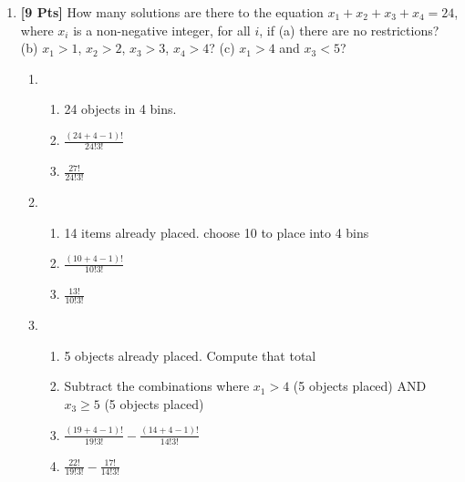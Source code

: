 \documentclass[11pt]{article}
\begin{document}
\begin{enumerate}
        \item {\bf [9 Pts]} How many solutions are there to the equation $x_1 + x_2 + x_3 + x_4 = 24$, where $x_i$ is a non-negative integer, for all $i$, if (a) there are no restrictions? (b) $x_1 > 1$, $x_2 > 2$, $x_3 > 3$, $x_4 > 4$? (c) $x_1 > 4$ and $x_3 < 5$?
        \begin{enumerate}
            \item
            \begin{enumerate}
                \item 24 objects in 4 bins.
                \item $\frac{(24 + 4 - 1)!}{24!3!}$
                \item $\frac{27!}{24!3!}$
            \end{enumerate}
            \item
            \begin{enumerate}
                \item 14 items already placed. choose 10 to place into 4 bins
                \item $\frac{(10 + 4 - 1)!}{10!3!}$
                \item $\frac{13!}{10!3!}$
            \end{enumerate}
            \item
            \begin{enumerate}
                \item 5 objects already placed. Compute that total
                \item Subtract the combinations where $x_1 > 4$ (5 objects placed) AND $x_3 \geq 5$ (5 objects placed)
                \item $\frac{(19 + 4 - 1)!}{19!3!} - \frac{(14 + 4 - 1)!}{14!3!}$
                \item $\frac{22!}{19!3!} - \frac{17!}{14!3!}$
            \end{enumerate}
        \end{enumerate}


\end{enumerate}
\end{document}
